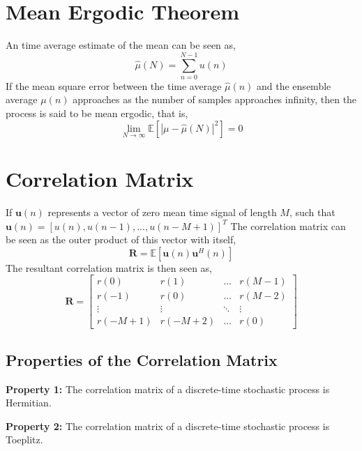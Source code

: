 \documentclass{article}
\begin{document}
    \section{Mean Ergodic Theorem}

    An time average estimate of the mean can be seen as,
    \begin{equation}
        \hat{\mu}(N) = \sum_{n=0}^{N-1} u(n)
    \end{equation}
    If the mean square error between the time average \(\hat{\mu}(n)\) and the ensemble average \(\mu(n)\) approaches as
    the number of samples approaches infinity, then the process is said to be mean ergodic, that is,
    \begin{equation}
        \lim_{N\to\infty} \mathbb{E}[|\mu-\hat{\mu}(N)|^2] = 0
    \end{equation}

    \section{Correlation Matrix}
    
    If \(\textbf{u}(n)\) represents a vector of zero mean time signal of length \(M\), such that 
    \(\textbf{u}(n) = [u(n), u(n-1), ..., u(n-M+1)]^T\) 
    The correlation matrix can be seen as the outer product of this vector with itself,
    \begin{equation}
        \textbf{R} = \mathbb{E}[\textbf{u}(n)\textbf{u}^H(n)]
    \end{equation}
    The resultant correlation matrix is then seen as,
    \[
    \textbf{R} = 
    \begin{bmatrix}
        r(0)    & r(1)      & \dots  & r(M-1) \\
        r(-1)   & r(0)      & \dots  & r(M-2) \\
        \vdots  & \vdots    & \ddots & \vdots \\
        r(-M+1) & r(-M+2)   & \dots  & r(0)
    \end{bmatrix}
    \]

    \subsection{Properties of the Correlation Matrix}

    \noindent\textbf{Property 1:} The correlation matrix of a discrete-time stochastic process is Hermitian.
    
    \noindent\textbf{Property 2:} The correlation matrix of a discrete-time stochastic process is Toeplitz.
\end{document}
